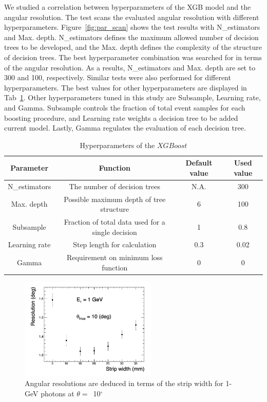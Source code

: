 \documentclass[preprint,12pt,times,a4paper]{elsarticle}
\newcommand{\XGB}{XGBoost}
\begin{document}
We studied a correlation between byperparameters of the XGB model and the angular resolution. The test scans the evaluated angular resolution with different hyperparameters. Figure~\ref{fig:par_scan} shows the test results with N\_estimators and Max. depth. N\_estimators defines the maximum allowed number of decision trees to be developed, and the Max. depth defines the complexity of the structure of decision trees. The best hyperparameter combination was searched for in terms of the angular resolution. As a results, N\_estimators and Max. depth are set to 300 and 100, respectively. Similar tests were also performed for different hyperparameters. The best values for other hyperparameters are displayed in Tab~\ref{tab:XgbPar}. Other hyperparameters tuned in this study are Subsample, Learning rate, and Gamma. Subsample controls the fraction of total event samples for each boosting procedure, and Learning rate weights a decision tree to be added current model. Lastly, Gamma regulates the evaluation of each decision tree.

\begin{table}[hbt!]{\small
\centering
\caption{Hyperparameters of the $\XGB$}
\begin{tabular}{cccc}
\hline 
Parameter & Function & Default value & Used value \\ \hline 
N\_estimators & The number of decision trees & N.A. & 300 \\  
Max. depth & Possible maximum depth of tree structure & 6 & 100 \\ 
Subsample & Fraction of total data used for a single decision & 1 & 0.8 \\ 
Learning rate & Step length for calculation & 0.3 & 0.02 \\ 
Gamma & Requirement on minimum loss function & 0 & 0 \\ 
\hline
\end{tabular}
\label{tab:XgbPar}
}\end{table}


\begin{figure}[!hbt]
\centering
\includegraphics[width=0.58\textwidth]{figures/res_width.jpg}
\caption{ Angular resolutions are deduced in terms of the strip width for 1-GeV photons at $\theta=$~10$^{\circ}$ }
\label{fig:angle_reco_width}
\end{figure}
\end{document}

